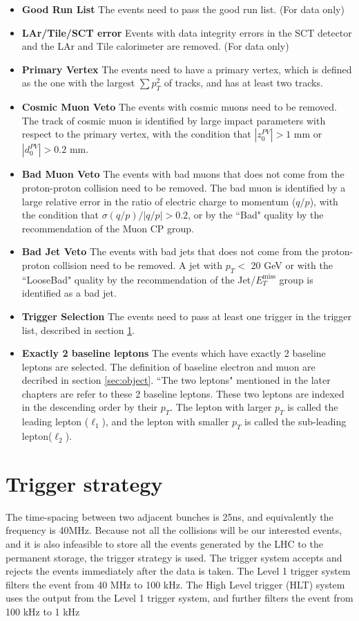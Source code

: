 \begin{itemize}
\item \textbf{Good Run List} The events need to pass the good run list. (For data only)
\item \textbf{LAr/Tile/SCT error} Events with data integrity errors in the SCT detector and the LAr and Tile calorimeter are removed. (For data only)
\item \textbf{Primary Vertex} The events need to have a primary vertex, which is defined as the one with the largest $\sum p_{T}^{2}$ of tracks, and has at least two tracks.
\item \textbf{Cosmic Muon Veto} The events with cosmic muons need to be removed. The track of cosmic muon is identified by large impact parameters with respect to the primary vertex, with the condition that $|z_{0}^{PV}|>1$ mm or $|d_{0}^{PV}|>0.2$ mm.
\item \textbf{Bad Muon Veto} The events with bad muons that does not come from the proton-proton collision need to be removed. The bad muon is identified by a large relative error in the ratio of electric charge to momentum ($q/p$), with the condition that $\sigma(q/p) / |q/p| > 0.2$, or by the ``Bad" quality by the recommendation of the Muon CP group.
\item \textbf{Bad Jet Veto} The events with bad jets that does not come from the proton-proton collision need to be removed. A jet with $p_{T}<$ 20 GeV or with the ``LooseBad" quality by the recommendation of the Jet/$E_T^{\text{miss}}$ group is identified as a bad jet.
\item \textbf{Trigger Selection} The events need to pass at least one trigger in the trigger list, described in section \ref{sec:trigger}.
\item \textbf{Exactly 2 baseline leptons} The events which have exactly 2 baseline leptons are selected. The definition of baseline electron and muon are decribed in section \ref{sec:object}. ``The two leptons" mentioned in the later chapters are refer to these 2 baseline leptons. These two leptons are indexed in the descending order by their $p_T$. The lepton with larger $p_T$ is called the leading lepton ($\ell_1$), and the lepton with smaller $p_T$ is called the sub-leading lepton($\ell_2$).
\end{itemize}

\section{Trigger strategy}
\label{sec:trigger}
The time-spacing between two adjacent bunches is 25ns, and equivalently the frequency is 40MHz.
Because not all the collisions will be our interested events, and it is also infeasible to store all the events generated by the LHC to the permanent storage, the trigger strategy is used.
The trigger system accepts and rejects the events immediately after the data is taken.
The Level 1 trigger system filters the event from 40 MHz to 100 kHz.
The High Level trigger (HLT) system uses the output from the Level 1 trigger system, and further filters the event from 100 kHz to 1 kHz

